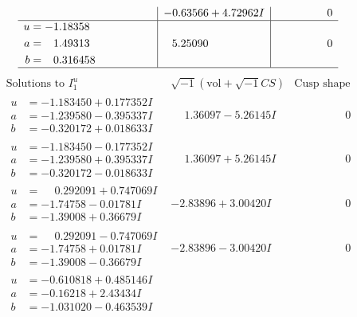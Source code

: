 \documentclass[1p]{elsarticle_modified}
\theoremstyle{definition}
\newcommand{\I}{\sqrt{-1}}
\begin{document}
$$\begin{array}{c|c|c}
 & -0.63566 + 4.72962 I & \phantom{-0.000000 } 0 \\ \hline\begin{aligned}
u &= -1.18358\phantom{ +0.000000I} \\
a &= \phantom{-}1.49313\phantom{ +0.000000I} \\
b &= \phantom{-}0.316458\phantom{ +0.000000I}\end{aligned}
 & \phantom{-}5.25090\phantom{ +0.000000I} & \phantom{-0.000000 } 0\\
 \hline 
 \end{array}$$\newpage$$\begin{array}{c|c|c}  
\text{Solutions to }I^u_{1}& \I (\text{vol} + \sqrt{-1}CS) & \text{Cusp shape}\\
 \hline 
\begin{aligned}
u &= -1.183450 + 0.177352 I \\
a &= -1.239580 - 0.395337 I \\
b &= -0.320172 + 0.018633 I\end{aligned}
 & \phantom{-}1.36097 - 5.26145 I & \phantom{-0.000000 } 0 \\ \hline\begin{aligned}
u &= -1.183450 - 0.177352 I \\
a &= -1.239580 + 0.395337 I \\
b &= -0.320172 - 0.018633 I\end{aligned}
 & \phantom{-}1.36097 + 5.26145 I & \phantom{-0.000000 } 0 \\ \hline\begin{aligned}
u &= \phantom{-}0.292091 + 0.747069 I \\
a &= -1.74758 - 0.01781 I \\
b &= -1.39008 + 0.36679 I\end{aligned}
 & -2.83896 + 3.00420 I & \phantom{-0.000000 } 0 \\ \hline\begin{aligned}
u &= \phantom{-}0.292091 - 0.747069 I \\
a &= -1.74758 + 0.01781 I \\
b &= -1.39008 - 0.36679 I\end{aligned}
 & -2.83896 - 3.00420 I & \phantom{-0.000000 } 0 \\ \hline\begin{aligned}
u &= -0.610818 + 0.485146 I \\
a &= -0.16218 + 2.43434 I \\
b &= -1.031020 - 0.463539 I\end{aligned}

\end{array}$$
\end{document}
